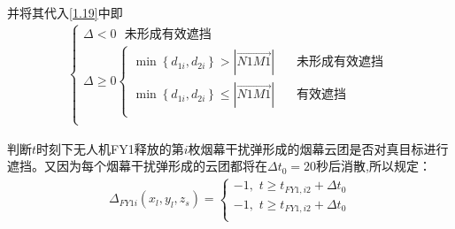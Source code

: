 \documentclass[../main.tex]{subfiles}
\begin{document}
\begin{itemize}
并将其代入\eqref{1.19}中即
\begin{align}\label{1.25657}
	\left\{ \begin{array}{l}
	\varDelta <0\ \ \ \text{未形成有效遮挡}\\
	\varDelta \ge 0\left\{ \begin{array}{l}
	\min \left\{ d_{1i},d_{2i} \right\} >\left| \overrightarrow{N1M1} \right|\ \ \ \ \ \ \ \ \text{未形成有效遮挡}\\
	\min \left\{ d_{1i},d_{2i} \right\} \le \left| \overrightarrow{N1M1} \right|\ \ \ \ \ \ \ \ \text{有效遮挡}\\
\end{array} \right.\\
\end{array} \right. 
\end{align}
\par 判断$t$时刻下无人机FY1释放的第$i$枚烟幕干扰弹形成的烟幕云团是否对真目标进行遮挡。又因为每个烟幕干扰弹形成的云团都将在$\Delta t_0 = 20$秒后消散,所以规定： 
\begin{align}\label{14.9}
\Delta _{FY1i}\left( x_l,y_l,z_s \right) =\left\{ \begin{array}{l}
-1,\,\,t\ge t_{FY1,i2}+\Delta t_0\\
-1,\,\,t\ge t_{FY1,i2}+\Delta t_0\\
\end{array} \right.
\end{align}
\end{itemize}
\end{document}
